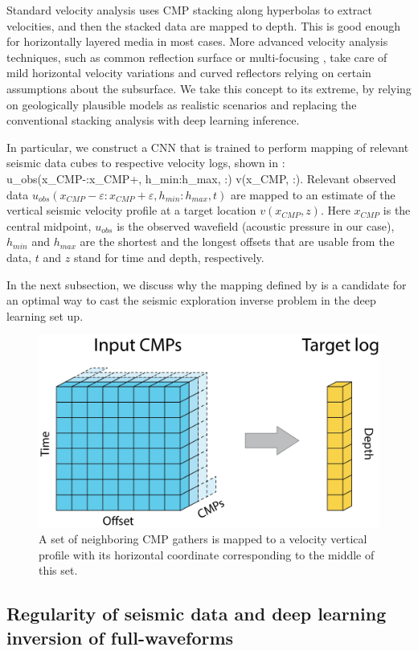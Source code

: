 \documentclass[paper,twocolomn]{geophysics}
\begin{document}
Standard velocity analysis uses CMP stacking along hyperbolas to extract velocities, and then the stacked data are mapped to depth. This is good enough for horizontally layered media in most cases. More advanced velocity analysis techniques, such as common reflection surface  \citep{mann1999common} or multi-focusing \citep{gelchinsky1999multifocusing}, take care of mild horizontal velocity variations and curved reflectors relying on certain assumptions about the subsurface. We take this concept to its extreme, by relying on geologically plausible models as realistic scenarios and replacing the conventional stacking analysis with deep learning inference.

In particular, we construct a CNN that is trained to perform mapping of relevant seismic data cubes to respective velocity logs, shown in : 
\beq \label{eq:mapping}
u_{obs}(x_{CMP}-\varepsilon:x_{CMP}+\varepsilon, h_{min}:h_{max}, :) \to v(x_{CMP}, :).
\eeq
Relevant observed data $u_{obs}(x_{CMP}-\varepsilon:x_{CMP}+\varepsilon, h_{min}:h_{max}, t)$ are mapped
to an estimate of the vertical seismic velocity profile at a target location $v(x_{CMP}, z)$. Here $x_{CMP}$ is the central midpoint,
$u_{obs}$ is the observed wavefield (acoustic pressure in our case), 
$h_{min}$ and $h_{max}$ are the shortest and the longest offsets that are usable from the data, $t$ and $z$ stand for time and depth, respectively.

In the next subsection, we discuss why the mapping defined by  is a candidate for an optimal way to cast the seismic exploration inverse problem in the deep learning set up.  
\begin{figure}[h!]
	\centering
	\includegraphics[width=0.7\linewidth]{Fig/in_out_shape}
	\caption{A set of neighboring CMP gathers is mapped to a velocity vertical profile with its horizontal coordinate corresponding to the middle of this set.}
	\label{fig:in_out}
\end{figure}

\subsection{Regularity of seismic data and deep learning inversion of full-waveforms}
\end{document}

